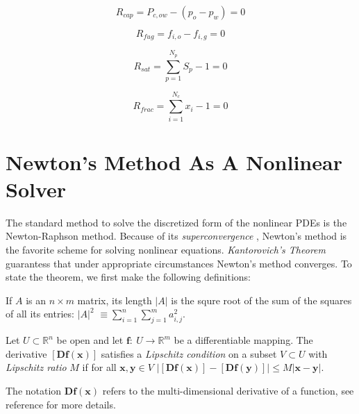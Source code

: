 \begin{equation}
	R_{cap} = P_{c,ow} - (p_{o} - p_{w}) = 0
\end{equation}

\begin{equation}
	R_{fug} = f_{i,o} - f_{i,g} = 0
\end{equation}

\begin{equation}
	R_{sat} = \sum_{p=1}^{N_{p}}S_{p} - 1 = 0
\end{equation}

\begin{equation}
	R_{frac} = \sum_{i=1}^{N_{c}}x_{i} - 1 = 0
\end{equation}

\section{Newton's Method As A Nonlinear Solver}
The standard method to solve the discretized form of the nonlinear PDEs is the Newton-Raphson method. 
Because of its \textit{superconvergence} \cite{hubbard}, Newton's method is the favorite scheme for solving nonlinear equations.
\textit{Kantorovich's Theorem} guarantess that under appropriate circumstances Newton's method converges.
To state the theorem, we first make the following definitions:
\begin{definition}
	If $A$ is an $n\times m$ matrix, its length $|A|$ is the squre root of the sum of the squares
	of all its entries:
		$|A|^{2}$ $\equiv \sum_{i=1}^{n}\sum_{j=1}^{m}a_{i,j}^{2}$.
\end{definition}

\begin{definition}
	Let $U \subset \mathbb{R}^{n}$ be open and let $\mathbf{f}: \ U \rightarrow \mathbb{R}^{m}$
	be a differentiable mapping. The derivative $[\mathbf{Df(x)}]$ satisfies a \textit{Lipschitz condition}
	on a subset $V \subset U$ with \textit{Lipschitz ratio} $M$ if for all $\mathbf{x,y}\in V$
	$\Big|[\mathbf{Df(x)}]-[\mathbf{Df(y)}]\Big| \leq M |\mathbf{x-y}|$.
\end{definition}
The notation $\mathbf{Df(x)}$ refers to the multi-dimensional derivative of a function, see reference \cite{hubbard} for more details.

